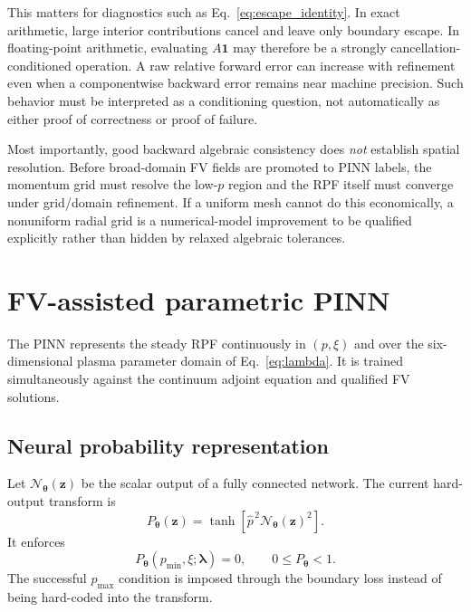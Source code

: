 \documentclass[11pt]{article}
\newcommand{\lam}{\bm\lambda}
\newcommand{\thetaNN}{\bm\theta}
\begin{document}
This matters for diagnostics such as Eq.~\eqref{eq:escape_identity}.  In exact arithmetic,
large interior contributions cancel and leave only boundary escape.  In floating-point
arithmetic, evaluating $A\bm1$ may therefore be a strongly cancellation-conditioned
operation.  A raw relative forward error can increase with refinement even when a
componentwise backward error remains near machine precision.  Such behavior must be
interpreted as a conditioning question, not automatically as either proof of correctness
or proof of failure.

Most importantly, good backward algebraic consistency does \emph{not} establish spatial
resolution.  Before broad-domain FV fields are promoted to PINN labels, the momentum grid
must resolve the low-$p$ region and the RPF itself must converge under grid/domain
refinement.  If a uniform mesh cannot do this economically, a nonuniform radial grid is a
numerical-model improvement to be qualified explicitly rather than hidden by relaxed
algebraic tolerances.

\section{FV-assisted parametric PINN}
\label{sec:pinn}

The PINN represents the steady RPF continuously in $(p,\xi)$ and over the six-dimensional
plasma parameter domain of Eq.~\eqref{eq:lambda}.  It is trained simultaneously against
the continuum adjoint equation and qualified FV solutions.

\subsection{Neural probability representation}

Let $\mathcal N_{\thetaNN}(\bm z)$ be the scalar output of a fully connected network.  The
current hard-output transform is
\begin{equation}
 \boxed{
 P_{\thetaNN}(\bm z)
 =\tanh\left[\widehat p^{\,2}\mathcal N_{\thetaNN}(\bm z)^2\right].
 }
 \label{eq:output_transform}
\end{equation}
It enforces
\begin{equation}
 P_{\thetaNN}(p_{\min},\xi;\lam)=0,
 \qquad
 0\le P_{\thetaNN}<1.
\end{equation}
The successful $p_{\max}$ condition is imposed through the boundary loss instead of being
hard-coded into the transform.
\end{document}
